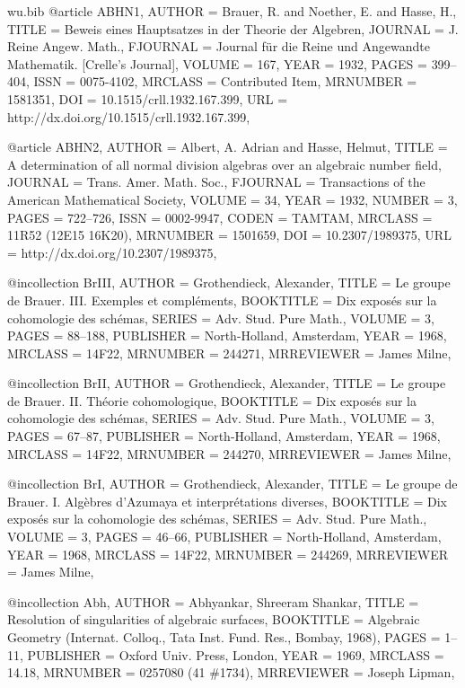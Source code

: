 \documentclass{amsart}
\numberwithin{equation}{section}
\theoremstyle{plain}
\theoremstyle{definition}
\begin{document}
\begin{filecontents}{wu.bib}
@article {ABHN1,
	AUTHOR = {Brauer, R. and Noether, E. and Hasse, H.},
	TITLE = {Beweis eines {H}auptsatzes in der {T}heorie der {A}lgebren},
	JOURNAL = {J. Reine Angew. Math.},
	FJOURNAL = {Journal f\"ur die Reine und Angewandte Mathematik. [Crelle's
		Journal]},
	VOLUME = {167},
	YEAR = {1932},
	PAGES = {399--404},
	ISSN = {0075-4102},
	MRCLASS = {Contributed Item},
	MRNUMBER = {1581351},
	DOI = {10.1515/crll.1932.167.399},
	URL = {http://dx.doi.org/10.1515/crll.1932.167.399},
}

@article {ABHN2,
	AUTHOR = {Albert, A. Adrian and Hasse, Helmut},
	TITLE = {A determination of all normal division algebras over an
		algebraic number field},
	JOURNAL = {Trans. Amer. Math. Soc.},
	FJOURNAL = {Transactions of the American Mathematical Society},
	VOLUME = {34},
	YEAR = {1932},
	NUMBER = {3},
	PAGES = {722--726},
	ISSN = {0002-9947},
	CODEN = {TAMTAM},
	MRCLASS = {11R52 (12E15 16K20)},
	MRNUMBER = {1501659},
	DOI = {10.2307/1989375},
	URL = {http://dx.doi.org/10.2307/1989375},
}

@incollection {BrIII,
    AUTHOR = {Grothendieck, Alexander},
     TITLE = {Le groupe de {B}rauer. {III}. {E}xemples et compl\'ements},
 BOOKTITLE = {Dix expos\'es sur la cohomologie des sch\'emas},
    SERIES = {Adv. Stud. Pure Math.},
    VOLUME = {3},
     PAGES = {88--188},
 PUBLISHER = {North-Holland, Amsterdam},
      YEAR = {1968},
   MRCLASS = {14F22},
  MRNUMBER = {244271},
MRREVIEWER = {James Milne},
}
		
@incollection {BrII,
    AUTHOR = {Grothendieck, Alexander},
     TITLE = {Le groupe de {B}rauer. {II}. {T}h\'eorie cohomologique},
 BOOKTITLE = {Dix expos\'es sur la cohomologie des sch\'emas},
    SERIES = {Adv. Stud. Pure Math.},
    VOLUME = {3},
     PAGES = {67--87},
 PUBLISHER = {North-Holland, Amsterdam},
      YEAR = {1968},
   MRCLASS = {14F22},
  MRNUMBER = {244270},
MRREVIEWER = {James Milne},
}
		
@incollection {BrI,
    AUTHOR = {Grothendieck, Alexander},
     TITLE = {Le groupe de {B}rauer. {I}. {A}lg\`ebres d'{A}zumaya et
              interpr\'etations diverses},
 BOOKTITLE = {Dix expos\'es sur la cohomologie des sch\'emas},
    SERIES = {Adv. Stud. Pure Math.},
    VOLUME = {3},
     PAGES = {46--66},
 PUBLISHER = {North-Holland, Amsterdam},
      YEAR = {1968},
   MRCLASS = {14F22},
  MRNUMBER = {244269},
MRREVIEWER = {James Milne},
}

@incollection {Abh,
  AUTHOR = {Abhyankar, Shreeram Shankar},
   TITLE = {Resolution of singularities of algebraic surfaces},
 BOOKTITLE = {Algebraic {G}eometry ({I}nternat. {C}olloq., {T}ata {I}nst.
       {F}und. {R}es., {B}ombay, 1968)},
   PAGES = {1--11},
 PUBLISHER = {Oxford Univ. Press, London},
   YEAR = {1969},
  MRCLASS = {14.18},
 MRNUMBER = {0257080 (41 \#1734)},
MRREVIEWER = {Joseph Lipman},
}


\end{filecontents}
\end{document}
